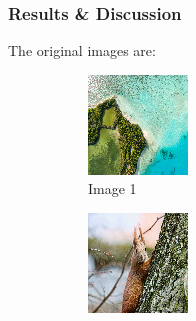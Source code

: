 \documentclass{homework}
\begin{document}
\subsubsection{Results \& Discussion}

The original images are:

\begin{figure}[H]
    \centering
    \begin{subfigure}{0.3\textwidth}
        \centering
        \includegraphics[width=\textwidth]{image1.png}
        \caption{Image 1}
    \end{subfigure}
    \begin{subfigure}{0.3\textwidth}
        \centering
        \includegraphics[width=\textwidth]{image2.png}

\end{subfigure}
\end{figure}
\end{document}

